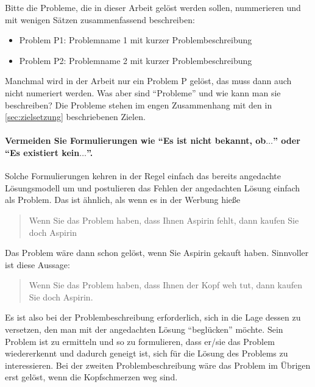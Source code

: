 \begin{temp}
Bitte die Probleme, die in dieser Arbeit gelöst werden sollen, nummerieren und mit wenigen Sätzen zusammenfassend beschreiben:

\begin{itemize}
\item Problem P1: Problemname 1 mit kurzer Problembeschreibung
\item Problem P2: Problemname 2 mit kurzer Problembeschreibung
\end{itemize}

Manchmal wird in der Arbeit nur ein Problem P gelöst, das muss dann auch nicht numeriert werden.
Was aber sind \enquote{Probleme} und wie kann man sie beschreiben?
Die Probleme stehen im engen Zusammenhang mit den in \cref{sec:zielsetzung} beschriebenen Zielen.

\paragraph{Vermeiden Sie Formulierungen wie \enquote{Es ist nicht bekannt, ob$\ldots$} oder \enquote{Es existiert kein$\ldots$}.}
Solche Formulierungen kehren in der Regel einfach das bereits angedachte Lösungsmodell um und postulieren das Fehlen der angedachten Lösung einfach als Problem.
Das ist ähnlich, als wenn es in der Werbung hieße \blockquote{Wenn Sie das Problem haben, dass Ihnen Aspirin fehlt, dann kaufen Sie doch Aspirin}.
Das Problem wäre dann schon gelöst, wenn Sie Aspirin gekauft haben.
Sinnvoller ist diese Aussage:
\blockquote{Wenn Sie das Problem haben, dass Ihnen der Kopf weh tut, dann kaufen Sie doch Aspirin.}
Es ist also bei der Problembeschreibung erforderlich, sich in die Lage dessen zu versetzen, den man mit der angedachten Lösung \enquote{beglücken} möchte.
Sein Problem ist zu ermitteln und so zu formulieren, dass er/sie das Problem wiedererkennt und dadurch geneigt ist, sich für die Lösung des Problems zu interessieren.
Bei der zweiten Problembeschreibung wäre das Problem im Übrigen erst gelöst, wenn die Kopfschmerzen weg sind.



\end{temp}
